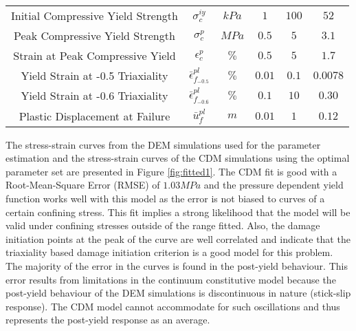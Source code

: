 \begin{table}[!htbp]
\begin{tabular}{@{}cccccc@{}}
Initial Compressive Yield Strength & $\sigma_c^{iy}$                  & $kPa$          & $1$                                                             & $100$                                                           & $52$                                                              \\
Peak Compressive Yield Strength    & $\sigma_c^{p}$                   & $MPa$          & $0.5$                                                           & $5$                                                             & $3.1$                                                             \\
Strain at Peak Compressive Yield   & $\epsilon_c^{p}$                 & $\%$           & $0.5$                                                           & $5$                                                             & $1.7$                                                             \\
Yield Strain at -0.5 Triaxiality   & $\bar{\epsilon}^{pl}_{f_{-0.5}}$ & $\%$           & $0.01$                                                          & $0.1$                                                           & $0.0078$                                                          \\
Yield Strain at -0.6 Triaxiality   & $\bar{\epsilon}^{pl}_{f_{-0.6}}$ & $\%$           & $0.1$                                                           & $10$                                                            & $0.30$                                                            \\
Plastic Displacement at Failure    & $\bar{u}^{pl}_f$                 & $m$            & $0.01$                                                          & $1$                                                             & $0.12$                                                            \\ \bottomrule
\end{tabular}
\end{table}

The stress-strain curves from the DEM simulations used for the parameter estimation and the stress-strain curves of the CDM simulations using the optimal parameter set are presented in Figure \ref{fig:fitted1}. The CDM fit is good with a Root-Mean-Square Error (RMSE) of $1.03MPa$ and the pressure dependent yield function works well with this model as the error is not biased to curves of a certain confining stress. This fit implies a strong likelihood that the model will be valid under confining stresses outside of the range fitted. Also, the damage initiation points at the peak of the curve are well correlated and indicate that the triaxiality based damage initiation criterion is a good model for this problem. The majority of the error in the curves is found in the post-yield behaviour. This error results from limitations in the continuum constitutive model because the post-yield behaviour of the DEM simulations is discontinuous in nature (stick-slip response). The CDM model cannot accommodate for such oscillations and thus represents the post-yield response as an average. 
